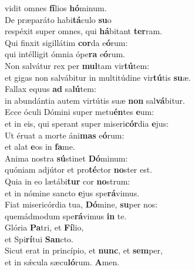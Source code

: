 \oddverse vidit omnes \textbf{fí}lios \textbf{hó}minum.\\
\evenverse De præparáto habi\textbf{tá}culo \textbf{su}o~\*\\
\evenverse respéxit super omnes, qui \textbf{há}bitant \textbf{ter}ram.\\
\oddverse Qui finxit sigillátim \textbf{cor}da e\textbf{ó}rum:~\*\\
\oddverse qui intélligit ómnia ópe\textbf{ra} e\textbf{ó}rum.\\
\evenverse Non salvátur rex per \textbf{mul}tam vir\textbf{tú}tem:~\*\\
\evenverse et gigas non salvábitur in multitúdine vir\textbf{tú}tis \textbf{su}æ.\\
\oddverse Fallax equus \textbf{ad} sa\textbf{lú}tem:~\*\\
\oddverse in abundántia autem virtútis suæ \textbf{non} sal\textbf{vá}bitur.\\
\evenverse Ecce óculi Dómini super metu\textbf{én}tes \textbf{e}um:~\*\\
\evenverse et in eis, qui sperant super miseri\textbf{cór}dia \textbf{e}jus:\\
\oddverse Ut éruat a morte áni\textbf{mas} e\textbf{ó}rum:~\*\\
\oddverse et alat \textbf{e}os in \textbf{fa}me.\\
\evenverse Anima nostra \textbf{sú}stinet \textbf{Dó}minum:~\*\\
\evenverse quóniam adjútor et pro\textbf{té}ctor \textbf{no}ster est.\\
\oddverse Quia in eo lætábi\textbf{tur} cor \textbf{no}strum:~\*\\
\oddverse et in nómine sancto \textbf{e}jus spe\textbf{rá}vimus.\\
\evenverse Fiat misericórdia tua, \textbf{Dó}mine, \textbf{su}per nos:~\*\\
\evenverse quemádmodum spe\textbf{rá}vimus \textbf{in} te.\\
\oddverse Glória \textbf{Pa}tri, et \textbf{Fí}lio,~\*\\
\oddverse et Spi\textbf{rí}tui \textbf{San}cto.\\
\evenverse Sicut erat in princípio, et \textbf{nunc}, et \textbf{sem}per,~\*\\
\evenverse et in sǽcula sæcu\textbf{ló}rum. \textbf{A}men.\\
